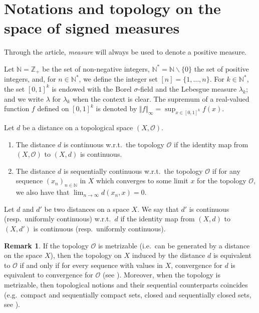 \documentclass{amsart}
\newcommand{\wrt}{w.r.t.\ }
\newcommand{\ie}{i.e.\ }
\newcommand{\eg}{e.g.\ }
\theoremstyle{plain}
\theoremstyle{definition}
\newtheorem{remark}[Th]{Remark}
\newcommand{\co}{\mathcal{O}}
\newcommand{\N}{\mathbb{N}}
\newcommand{\Z}{\mathbb{Z}}
\newcommand{\norm}[1]{\Vert#1\Vert}
\begin{document}
\tableofcontents


\section{Notations and topology on the space of signed measures}\label{section_notations}

Through the article, \emph{measure} will always be used to denote a positive measure.

Let     $\N=\Z_+$  be   the      set     of     non-negative     integers,
$\N^*=\N\backslash  \{0\}$  the  set  of  positive  integers,  and,  for
$n\in\N^*$, we define the integer set $[n] = \{1,\dots, n\}$.
For $k\in \N^*$, the set $[0, 1]^k$ is endowed with the Borel $\sigma$-field 
and the Lebesgue measure $\lambda_k$; and we write $\lambda$ for
$\lambda_k$ when the context is clear. The supremum of a
real-valued
function $f$ defined on $[0, 1]^k$ is denoted by $\norm{f}_{\infty}=\sup_{x\in [0,
  1]^k} f(x)$. 
\medskip


Let $d$ be a distance on a topological space $(X, \co)$.
\begin{enumerate}[label=(\roman*)]
   \item The distance $d$ is  continuous \wrt the  topology $\co$
if the identity map  from $(X,\co)$ to $(X, d)$ is
  continuous.
\item  The distance  $d$ is  sequentially continuous  \wrt the  topology
  $\co$ if for  any sequence $(x_n)_{n\in\N}$ in $X$  which converges to
  some limit $x$ for the topology $\co$, we also have that $\lim_{n\rightarrow \infty }d(x_n, x)=0$.
    \end{enumerate}

Let $d$ and $d'$ be two distances on a space $X$. We say that $d'$ is
continuous (resp.\ uniformly continuous) \wrt $d$ if the identity map from $(X, d)$ to $(X,
d')$ is continuous (resp.\ uniformly continuous). 

 \begin{remark}\label{rem_metrizable_topo_seq}
 If the topology $\co$ is metrizable (\ie can be generated by a distance on the space $X$),
 then the topology on $X$ induced by the distance $d$ is equivalent to $\co$
 if and only if for every sequence with values in $X$, 
 	convergence for $d$ is equivalent to convergence for $\co$
(see \cite[Theorem 4.1.2]{EngelkingGeneralTopology}).
Moreover, when the topology is metrizable, then topological notions
	and their sequential counterparts coincides
	(\eg compact and sequentially compact sets, closed and sequentially closed sets,
		see \cite[Proposition 4.1.1 and Theorem 4.1.17]{EngelkingGeneralTopology}).
 \end{remark}
\end{document}
